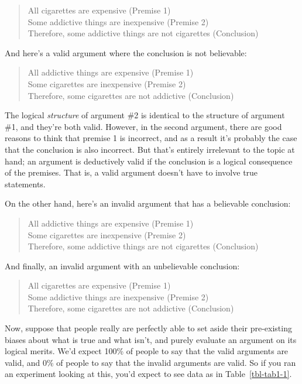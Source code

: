 \documentclass[
  a4paper,
]{book}
\begin{document}
\begin{quote}
All cigarettes are expensive (Premise 1)\\
Some addictive things are inexpensive (Premise 2)\\
Therefore, some addictive things are not cigarettes (Conclusion)
\end{quote}

And here's a valid argument where the conclusion is not believable:

\begin{quote}
All addictive things are expensive (Premise 1)\\
Some cigarettes are inexpensive (Premise 2)\\
Therefore, some cigarettes are not addictive (Conclusion)
\end{quote}

The logical \emph{structure} of argument \#2 is identical to the
structure of argument \#1, and they're both valid. However, in the
second argument, there are good reasons to think that premise 1 is
incorrect, and as a result it's probably the case that the conclusion is
also incorrect. But that's entirely irrelevant to the topic at hand; an
argument is deductively valid if the conclusion is a logical consequence
of the premises. That is, a valid argument doesn't have to involve true
statements.

On the other hand, here's an invalid argument that has a believable
conclusion:

\begin{quote}
All addictive things are expensive (Premise 1)\\
Some cigarettes are inexpensive (Premise 2)\\
Therefore, some addictive things are not cigarettes (Conclusion)
\end{quote}

And finally, an invalid argument with an unbelievable conclusion:

\begin{quote}
All cigarettes are expensive (Premise 1)\\
Some addictive things are inexpensive (Premise 2)\\
Therefore, some cigarettes are not addictive (Conclusion)
\end{quote}

Now, suppose that people really are perfectly able to set aside their
pre-existing biases about what is true and what isn't, and purely
evaluate an argument on its logical merits. We'd expect 100\% of people
to say that the valid arguments are valid, and 0\% of people to say that
the invalid arguments are valid. So if you ran an experiment looking at
this, you'd expect to see data as in Table~\ref{tbl-tab1-1}.
\end{document}
